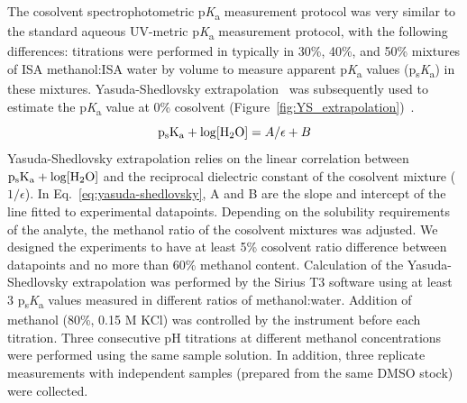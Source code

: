 \documentclass[9pt,lineno]{elife}
\newcommand{\pKa}{p\textit{K}\textsubscript{a}}
\newcommand{\psKa}{p\textsubscript{s}\textit{K}\textsubscript{a}}
\begin{document}
The cosolvent spectrophotometric \pKa{} measurement protocol was very similar to the standard aqueous UV-metric \pKa{} measurement protocol, with the following differences: 
titrations were performed in typically in 30\%, 40\%, and 50\% mixtures of ISA methanol:ISA water by volume to measure apparent \pKa{} values (\psKa) in these mixtures. 
Yasuda-Shedlovsky extrapolation~\citep{yasuda_dissociation_1959, shedlovsky_1962} was subsequently used to estimate the \pKa{} value at 0\% cosolvent (Figure~\ref{fig:YS_extrapolation})~\citep{avdeef_ph-metric_1999,doi:10.1021/ac00049a010,TAKACSNOVAK1997235}. 
\begin{equation}
\mathrm{p_{s}K_{a}} + \log [\ce{H2O}]=A/\epsilon+B 
\label{eq:yasuda-shedlovsky}
\end{equation}
Yasuda-Shedlovsky extrapolation relies on the linear correlation between $\mathrm{p_{s}K_{a}} + \log [\ce{H2O}]$ and the reciprocal dielectric constant of the cosolvent mixture ($1/\epsilon$). 
In Eq.~\ref{eq:yasuda-shedlovsky}, A and B are the slope and intercept of the line fitted to experimental datapoints.  
Depending on the solubility requirements of the analyte, the methanol ratio of the cosolvent mixtures was adjusted. 
We designed the experiments to have at least 5\% cosolvent ratio difference between datapoints and no more than 60\% methanol content. 
Calculation of the Yasuda-Shedlovsky extrapolation was performed by the Sirius T3 software using at least 3 \psKa{} values measured in different ratios of methanol:water.
Addition of methanol (80\%, 0.15 M KCl) was controlled by the instrument before each titration. 
Three consecutive pH titrations at different methanol concentrations were performed using the same sample solution. 
In addition, three replicate measurements with independent samples (prepared from the same DMSO stock) were collected.
\end{document}
